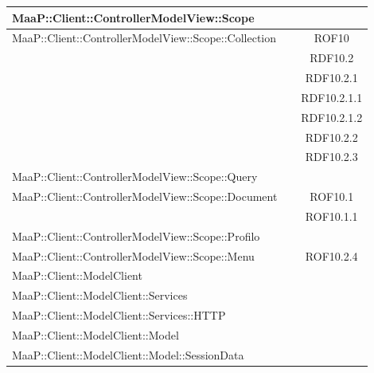\begin{center}
\begin{longtable}{|p{0.8\linewidth}|c|}
\midrule 
MaaP::Client::ControllerModelView::Scope
& \\

\midrule 
MaaP::Client::ControllerModelView::Scope::Collection
& ROF10\\
& RDF10.2\\
& RDF10.2.1\\
& RDF10.2.1.1\\
& RDF10.2.1.2\\
& RDF10.2.2\\
& RDF10.2.3\\

\midrule 
MaaP::Client::ControllerModelView::Scope::Query
& \\

\midrule 
MaaP::Client::ControllerModelView::Scope::Document
& ROF10.1\\
& ROF10.1.1\\


\midrule 
MaaP::Client::ControllerModelView::Scope::Profilo
& \\

\midrule 
MaaP::Client::ControllerModelView::Scope::Menu
& ROF10.2.4\\

\midrule 
MaaP::Client::ModelClient
& \\

\midrule 
MaaP::Client::ModelClient::Services
& \\

\midrule 
MaaP::Client::ModelClient::Services::HTTP
& \\

\midrule 
MaaP::Client::ModelClient::Model
& \\

\midrule 
MaaP::Client::ModelClient::Model::SessionData
& \\

\end{longtable}
\end{center}

